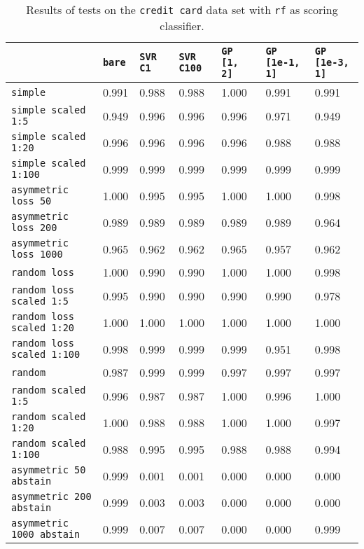 \begin{table}[H]
{\scriptsize
\begin{tabu}{l|l|l|l|l|l|l}
&\texttt{bare} &\texttt{SVR C1} &\texttt{SVR C100} &\texttt{GP [1, 2]} &\texttt{GP [1e-1, 1]} &\texttt{GP [1e-3, 1]}  \\
\hline
\texttt{simple} &0.991 &0.988 &0.988 &1.000 &0.991 &0.991 \\
\texttt{simple scaled 1:5} &0.949 &0.996 &0.996 &0.996 &0.971 &0.949 \\
\texttt{simple scaled 1:20} &0.996 &0.996 &0.996 &0.996 &0.988 &0.988 \\
\texttt{simple scaled 1:100} &0.999 &0.999 &0.999 &0.999 &0.999 &0.999 \\
\texttt{asymmetric loss 50} &1.000 &0.995 &0.995 &1.000 &1.000 &0.998 \\
\texttt{asymmetric loss 200} &0.989 &0.989 &0.989 &0.989 &0.989 &0.964 \\
\texttt{asymmetric loss 1000} &0.965 &0.962 &0.962 &0.965 &0.957 &0.962 \\
\texttt{random loss} &1.000 &0.990 &0.990 &1.000 &1.000 &0.998 \\
\texttt{random loss scaled 1:5} &0.995 &0.990 &0.990 &0.990 &0.990 &0.978 \\
\texttt{random loss scaled 1:20} &1.000 &1.000 &1.000 &1.000 &1.000 &1.000 \\
\texttt{random loss scaled 1:100} &0.998 &0.999 &0.999 &0.999 &0.951 &0.998 \\
\texttt{random} &0.987 &0.999 &0.999 &0.997 &0.997 &0.997 \\
\texttt{random scaled 1:5} &0.996 &0.987 &0.987 &1.000 &0.996 &1.000 \\
\texttt{random scaled 1:20} &1.000 &0.988 &0.988 &1.000 &1.000 &0.997 \\
\texttt{random scaled 1:100} &0.988 &0.995 &0.995 &0.988 &0.988 &0.994 \\
\texttt{asymmetric 50 abstain} &0.999 &0.001 &0.001 &0.000 &0.000 &0.000 \\
\texttt{asymmetric 200 abstain} &0.999 &0.003 &0.003 &0.000 &0.000 &0.000 \\
\texttt{asymmetric 1000 abstain} &0.999 &0.007 &0.007 &0.000 &0.000 &0.999 \\
\end{tabu} }
\caption{Results of tests on the \texttt{credit card} data set
         with \texttt{rf} as scoring classifier.}
\end{table}

